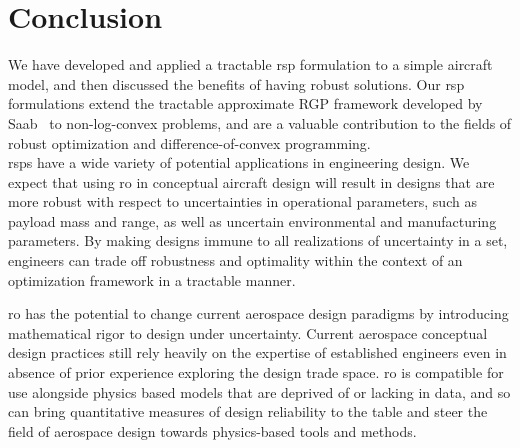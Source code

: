\section{Conclusion}

We have developed and applied a tractable \gls{rsp} formulation to a simple aircraft model,
and then discussed the benefits of having robust solutions. Our \gls{rsp} formulations extend
the tractable approximate RGP framework developed by Saab~\cite{Saab2018} to non-log-convex problems,
and are a valuable contribution to the fields of robust optimization and difference-of-convex programming.\\

\gls{rsp}s have a wide variety of potential applications in engineering design.
We expect that using \gls{ro} in conceptual aircraft design will result in designs
that are more robust with respect to uncertainties in operational parameters,
such as payload mass and range, as well as uncertain environmental and manufacturing parameters.
By making designs immune to all realizations of uncertainty in a set, engineers can trade off
robustness and optimality within the context of an optimization framework in a tractable manner.

\gls{ro} has
the potential to change current aerospace design paradigms by introducing
mathematical rigor to design under uncertainty. Current aerospace
conceptual design practices still rely heavily on the expertise of established
engineers even in absence of prior experience exploring the design trade space.
\gls{ro} is compatible for use alongside physics based models
that are deprived of or lacking in data, and so can bring quantitative
measures of design reliability to the table and
steer the field of aerospace design towards physics-based tools and methods.


